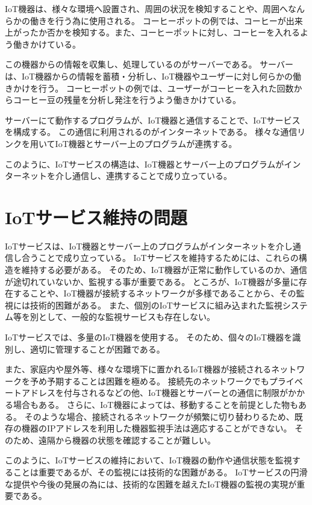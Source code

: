 IoT機器は、様々な環境へ設置され、周囲の状況を検知することや、周囲へなんらかの働きを行う為に使用される。
コーヒーポットの例では、コーヒーが出来上がったか否かを検知する。また、コーヒーポットに対し、コーヒーを入れるよう働きかけている。
\medskip

この機器からの情報を収集し、処理しているのがサーバーである。
サーバーは、IoT機器からの情報を蓄積・分析し、IoT機器やユーザーに対し何らかの働きかけを行う。
コーヒーポットの例では、ユーザーがコーヒーを入れた回数からコーヒー豆の残量を分析し発注を行うよう働きかけている。
\medskip

サーバーにて動作するプログラムが、IoT機器と通信することで、IoTサービスを構成する。
この通信に利用されるのがインターネットである。
様々な通信リンクを用いてIoT機器とサーバー上のプログラムが連携する。
\medskip

このように、IoTサービスの構造は、IoT機器とサーバー上のプログラムがインターネットを介し通信し、連携することで成り立っている。

\section{IoTサービス維持の問題}
IoTサービスは、IoT機器とサーバー上のプログラムがインターネットを介し通信し合うことで成り立っている。
IoTサービスを維持するためには、これらの構造を維持する必要がある。
そのため、IoT機器が正常に動作しているのか、通信が途切れていないか、監視する事が重要である。
ところが、IoT機器が多量に存在することや、IoT機器が接続するネットワークが多様であることから、その監視には技術的困難がある。
また、個別のIoTサービスに組み込まれた監視システム等を別として、一般的な監視サービスも存在しない。
\medskip

IoTサービスでは、多量のIoT機器を使用する。
そのため、個々のIoT機器を識別し、適切に管理することが困難である。
\medskip

また、家庭内や屋外等、様々な環境下に置かれるIoT機器が接続されるネットワークを予め予期することは困難を極める。
接続先のネットワークでもプライベートアドレスを付与されるなどの他、IoT機器とサーバーとの通信に制限がかかる場合もある。
さらに、IoT機器によっては、移動することを前提とした物もある。
そのような場合、接続されるネットワークが頻繁に切り替わりるため、既存の機器のIPアドレスを利用した機器監視手法は適応することができない。
そのため、遠隔から機器の状態を確認することが難しい。
\medskip

このように、IoTサービスの維持において、IoT機器の動作や通信状態を監視することは重要であるが、その監視には技術的な困難がある。
IoTサービスの円滑な提供や今後の発展の為には、技術的な困難を越えたIoT機器の監視の実現が重要である。


